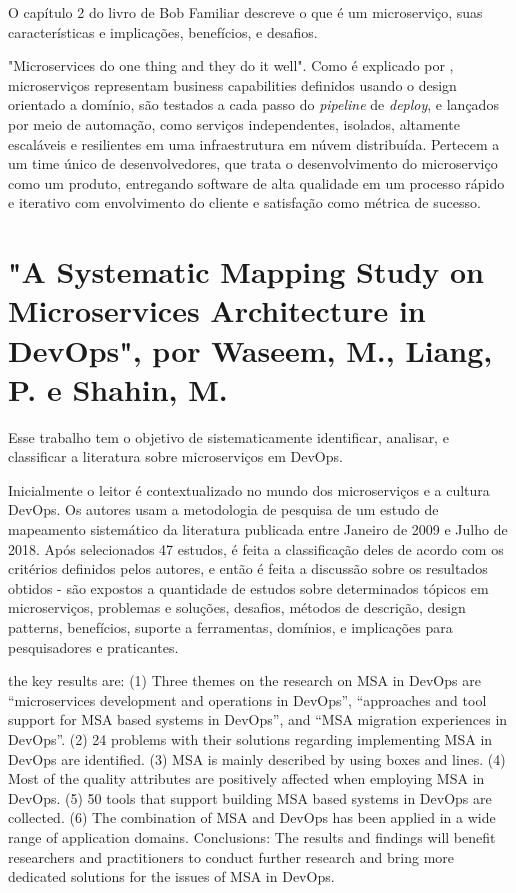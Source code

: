 O capítulo 2 do livro de Bob Familiar descreve o que é um microserviço, suas características e implicações, benefícios, e desafios. 

"Microservices do one thing and they do it well". Como é explicado por  , microserviços representam business capabilities definidos usando o design orientado a domínio, são testados a cada passo do \emph{pipeline} de \emph{deploy}, e lançados por meio de automação, como serviços independentes, isolados, altamente escaláveis e resilientes em uma infraestrutura em núvem distribuída. Pertecem a um time único de desenvolvedores, que trata o desenvolvimento do microserviço como um produto, entregando software de alta qualidade em um processo rápido e iterativo com envolvimento do cliente e satisfação como métrica de sucesso.

\section*{"A Systematic Mapping Study on Microservices Architecture in DevOps", por Waseem, M., Liang, P. e Shahin, M.}

Esse trabalho tem o objetivo de sistematicamente identificar, analisar, e classificar a literatura sobre microserviços em DevOps.

Inicialmente o leitor é contextualizado no mundo dos microserviços e a cultura DevOps. Os autores usam a metodologia de pesquisa de um estudo de mapeamento sistemático da literatura publicada entre Janeiro de 2009 e Julho de 2018. Após selecionados 47 estudos, é feita a classificação deles de acordo com os critérios definidos pelos autores, e então é feita a discussão sobre os resultados obtidos - são expostos a quantidade de estudos sobre determinados tópicos em microserviços, problemas e soluções, desafios, métodos de descrição, design patterns, benefícios, suporte a ferramentas, domínios, e implicações para pesquisadores e praticantes.

the key results are: (1) Three themes on the research on MSA in DevOps are “microservices development and operations in DevOps”, “approaches and tool support for MSA based systems in DevOps”, and “MSA migration experiences in DevOps”. (2) 24 problems with their solutions regarding implementing MSA in DevOps are identified. (3) MSA is mainly described by using boxes and lines. (4) Most of the quality attributes are positively affected when employing MSA in DevOps. (5) 50 tools that support building MSA based systems in DevOps are collected. (6) The combination of MSA and DevOps has been applied in a wide range of application domains. Conclusions: The results and findings will benefit researchers and practitioners to conduct further research and bring more dedicated solutions for the issues of MSA in DevOps.

